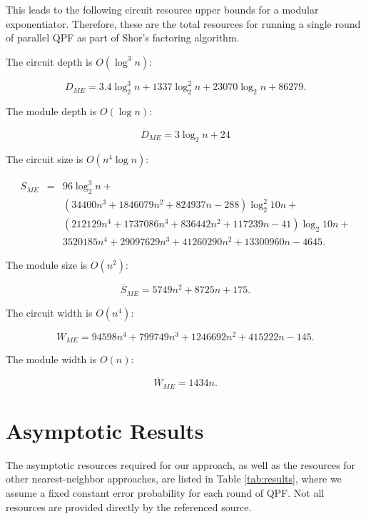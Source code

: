 \documentclass[twoside]{article}
\begin{document}
This leads to the following circuit resource upper bounds for a modular exponentiator. Therefore, these are the total resources for running a
single round of parallel QPF as part of Shor's factoring algorithm.

The circuit depth is $O(\log^3 n)$:

\begin{equation}
D_{ME} = 3.4\log_2^3 n + 1337\log_2^2 n + 23070\log_2 n + 86279\text{.}
\end{equation}

The module depth is $O(\log n)$:

\begin{equation}
\overline{D}_{ME} = 3\log_2 n + 24
\end{equation}

The circuit size is $O(n^4 \log n)$:

\begin{eqnarray}
S_{ME} & = & 96 \log_2^3 n + \nonumber \\
       &   & (34400 n^3 + 1846079 n^2 + 824937 n - 288)\log_2^2 10n + \nonumber \\
       &   & (212129 n^4 + 1737086 n^3 + 836442 n^2 + 117239 n - 41) \log_2 10n + \nonumber \\
       &   & 3520185 n^4 + 29097629 n^3 + 41260290 n^2 + 13300960 n - 4645\text{.}
\end{eqnarray}

The module size is $O(n^2)$:

\begin{equation}
\overline{S}_{ME} = 5749n^2 + 8725n +175\text{.}
\end{equation}

The circuit width is $O(n^4)$:

\begin{equation}
W_{ME} = 94598n^4 + 799749 n^3 + 1246692 n^2 + 415222 n - 145\text{.}
\end{equation}

The module width is $O(n)$:

\begin{equation}
\overline{W}_{ME} = 1434n\text{.}
\end{equation}

%
\section{Asymptotic Results}
\label{sec:results}

The asymptotic resources required for our approach,
as well as the resources for other nearest-neighbor approaches,
are listed in Table \ref{tab:results},
where we assume a fixed constant error
probability for each round of QPF. Not all resources are
provided directly by the referenced source.
\end{document}
